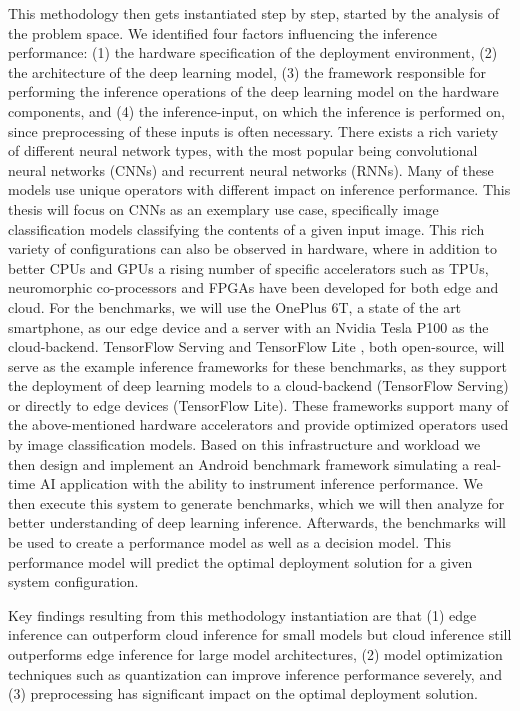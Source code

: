This methodology then gets instantiated step by step, started by the analysis of the problem space.
We identified four factors influencing the inference performance: (1) the hardware specification of the deployment environment, (2) the architecture of the deep learning model, (3) the framework responsible for performing the inference operations of the deep learning model on the hardware components, and (4) the inference-input, on which the inference is performed on, since preprocessing of these inputs is often necessary.
There exists a rich variety of different neural network types, with the most popular being convolutional neural networks (CNNs) and recurrent neural networks (RNNs).
Many of these models use unique operators with different impact on inference performance.
This thesis will focus on CNNs as an exemplary use case, specifically image classification models classifying the contents of a given input image.
This rich variety of configurations can also be observed in hardware, where in addition to better CPUs and GPUs a rising number of specific accelerators such as TPUs, neuromorphic co-processors and FPGAs have been developed for both edge and cloud.
For the benchmarks, we will use the OnePlus 6T, a state of the art smartphone, as our edge device and a server with an Nvidia Tesla P100 as the cloud-backend.
TensorFlow Serving \cite{tfServing} and TensorFlow Lite \cite{tfLite}, both open-source, will serve as the example inference frameworks for these benchmarks, as they support the deployment of deep learning models to a cloud-backend (TensorFlow Serving) or directly to edge devices (TensorFlow Lite). These frameworks support many of the above-mentioned hardware accelerators and provide optimized operators used by image classification models.
Based on this infrastructure and workload we then design and implement an Android benchmark framework simulating a real-time AI application with the ability to instrument inference performance.
We then execute this system to generate benchmarks, which we will then analyze for better understanding of deep learning inference. Afterwards, the benchmarks will be used to create a performance model as well as a decision model.
This performance model will predict the optimal deployment solution for a given system configuration.

Key findings resulting from this methodology instantiation are that (1) edge inference can outperform cloud inference for small models but cloud inference still outperforms edge inference for large model architectures, (2) model optimization techniques such as quantization can improve inference performance severely, and (3) preprocessing has significant impact on the optimal deployment solution.

